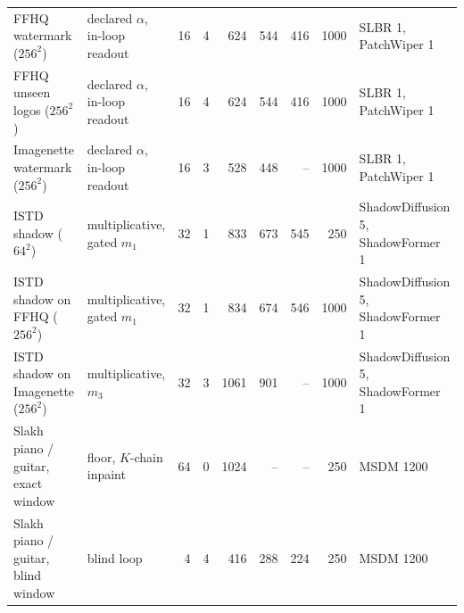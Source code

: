 \begin{table}[t]
\begin{tabular}{@{}llrrrrrrl@{}}
        FFHQ watermark ($256^2$) & declared $\alpha$, in-loop readout & 16 & 4 & 624 & 544 & 416 & 1000 & SLBR 1, PatchWiper 1 \\
        FFHQ unseen logos ($256^2$) & declared $\alpha$, in-loop readout & 16 & 4 & 624 & 544 & 416 & 1000 & SLBR 1, PatchWiper 1 \\
        Imagenette watermark ($256^2$) & declared $\alpha$, in-loop readout & 16 & 3 & 528 & 448 & -- & 1000 & SLBR 1, PatchWiper 1 \\
        \midrule
        ISTD shadow ($64^2$) & multiplicative, gated $m_1$ & 32 & 1 & 833 & 673 & 545 & 250 & ShadowDiffusion 5, ShadowFormer 1 \\
        ISTD shadow on FFHQ ($256^2$) & multiplicative, gated $m_1$ & 32 & 1 & 834 & 674 & 546 & 1000 & ShadowDiffusion 5, ShadowFormer 1 \\
        ISTD shadow on Imagenette ($256^2$) & multiplicative, $m_3$ & 32 & 3 & 1061 & 901 & -- & 1000 & ShadowDiffusion 5, ShadowFormer 1 \\
        \midrule
        Slakh piano / guitar, exact window & floor, $K$-chain inpaint & 64 & 0 & 1024 & -- & -- & 250 & MSDM 1200 \\
        Slakh piano / guitar, blind window & blind loop & 4 & 4 & 416 & 288 & 224 & 250 & MSDM 1200 \\
        \bottomrule
    \end{tabular}
\end{table}
